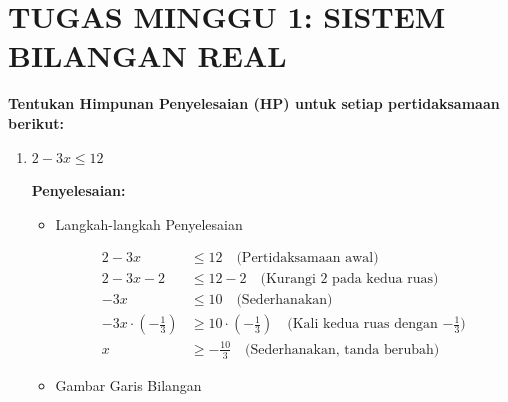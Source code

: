 \documentclass{article}
\begin{document}
\section*{TUGAS MINGGU 1: SISTEM BILANGAN REAL}
\textbf{Tentukan Himpunan Penyelesaian (HP) untuk setiap pertidaksamaan berikut:}

\begin{enumerate}
    \item $2-3x \le 12$
    
    \textbf{Penyelesaian:}
    
    \begin{itemize}
    \item Langkah-langkah Penyelesaian
    
    \begin{align}
    2 - 3x &\leq 12 \quad \text{(Pertidaksamaan awal)} \\
    2 - 3x - 2 &\leq 12 - 2 \quad \text{(Kurangi 2 pada kedua ruas)} \\
    -3x &\leq 10 \quad \text{(Sederhanakan)} \\
    -3x \cdot \left(-\frac{1}{3}\right) &\geq 10 \cdot \left(-\frac{1}{3}\right) \quad \text{(Kali kedua ruas dengan $-\frac{1}{3}$)} \\
    x &\geq -\frac{10}{3} \quad \text{(Sederhanakan, tanda berubah)}
    \end{align}
    
    \item Gambar Garis Bilangan
    
    \begin{center}
    \end{center}
    

\end{itemize}
\end{enumerate}
\end{document}
